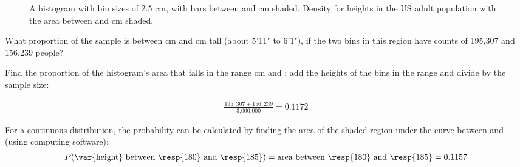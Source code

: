 \begin{figure}[h]
	\centering
	\caption{ A histogram with bin sizes of 2.5 cm, with bars between  and  cm shaded.   Density for heights in the US adult population with the area between  and  cm shaded.}
\end{figure}

\begin{example}{What proportion of the sample is between  cm and  cm tall (about 5'11" to 6'1"), if the two bins in this region have counts of 195,307 and 156,239 people?}\label{contDistProb}
	
	Find the proportion of the histogram's area that falls in the range  cm and : add the heights of the bins in the range and divide by the sample size:
	
	\begin{align*}                                                    
	\frac{195,307+156,239}{\text{3,000,000}} = 0.1172                
	\end{align*}
\end{example}

For a continuous distribution, the probability can be calculated by finding the area of the shaded region under the curve between  and  (using computing software):
\begin{align*}
P(\text{\var{height} between \resp{180} and \resp{185}})
	= \text{area between \resp{180} and \resp{185}}
	= 0.1157
\end{align*}

